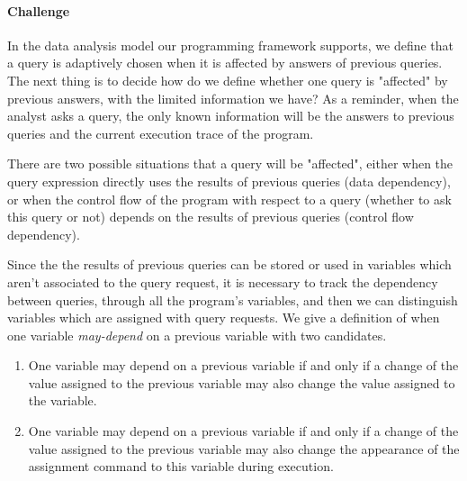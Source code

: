 \paragraph*{Challenge}
In the data analysis model our programming framework supports, 
  we define that a query is adaptively chosen when it is affected by answers of previous queries. The next thing is to decide how do we define whether one query is "affected" by previous answers, with the limited information we have? As a reminder, 
 when the analyst asks a query, the only known information will be the answers to previous queries and the current execution trace of the program.


There are two possible situations that a query will be "affected",  
either when the query expression directly uses the results of previous queries (data dependency), or when the control flow of the program with respect to a query (whether to ask this query or not) depends on the results of previous queries (control flow dependency).


Since the the results of previous queries can be stored or used in variables
which aren't associated to the query request,
it is necessary to track the dependency between queries, through all the program's variables,  
and then we can distinguish variables which are assigned with query requests.
 We give a definition of when one variable \emph{may-depend} on a previous variable with two candidates.
{
\begin{enumerate}
    \item One variable may depend on a previous variable if and only if a change of the value assigned to the previous variable may also change the value assigned to the variable.
    \item One variable may depend on a previous variable if and only if a change of the value assigned to the previous variable may also change the appearance of the assignment command to this variable 
    during execution.
\end{enumerate}
}

